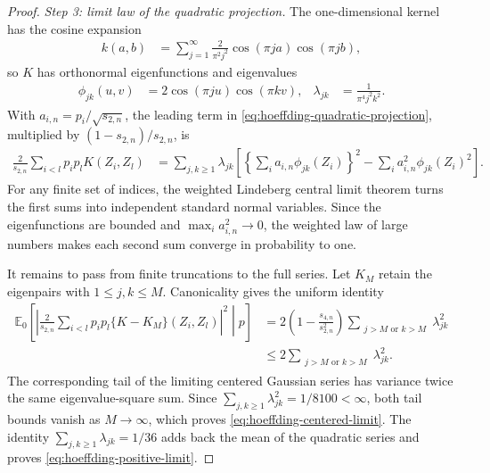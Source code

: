 \begin{proof}
\medskip\noindent
\emph{Step 3: limit law of the quadratic projection.}
The one-dimensional kernel has the cosine expansion
\begin{align*}
  k(a,b)
  &= \sum_{j=1}^{\infty}
     \frac{2}{\pi^2j^2}\cos(\pi ja)\cos(\pi jb),
\end{align*}
so $K$ has orthonormal eigenfunctions and eigenvalues
\begin{align*}
  \phi_{jk}(u,v)
  &=2\cos(\pi ju)\cos(\pi kv),
  &
  \lambda_{jk}
  &=\frac{1}{\pi^4j^2k^2}.
\end{align*}
With $a_{i,n}=p_i/\sqrt{s_{2,n}}$, the leading term in
\eqref{eq:hoeffding-quadratic-projection}, multiplied by
$(1-s_{2,n})/s_{2,n}$, is
\begin{align*}
  \frac{2}{s_{2,n}}\sum_{i<l}p_ip_lK(Z_i,Z_l)
  &=
  \sum_{j,k\geq1}\lambda_{jk}
  \left[
    \left\{\sum_i a_{i,n}\phi_{jk}(Z_i)\right\}^2
    -\sum_i a_{i,n}^2\phi_{jk}(Z_i)^2
  \right].
\end{align*}
For any finite set of indices, the weighted Lindeberg central limit theorem
turns the first sums into independent standard normal variables. Since the
eigenfunctions are bounded and $\max_i a_{i,n}^2\to0$, the weighted law of
large numbers makes each second sum converge in probability to one.

It remains to pass from finite truncations to the full series. Let $K_M$
retain the eigenpairs with $1\leq j,k\leq M$. Canonicality gives the
uniform identity
\begin{align*}
  \mathbb{E}_0\!\left[
    \left|
      \frac{2}{s_{2,n}}\sum_{i<l}p_ip_l
      \{K-K_M\}(Z_i,Z_l)
    \right|^2
    \middle|p
  \right]
  &=
  2\left(1-\frac{s_{4,n}}{s_{2,n}^2}\right)
  \sum_{\substack{j>M\text{ or }k>M}}
  \lambda_{jk}^2\\
  &\leq
  2\sum_{\substack{j>M\text{ or }k>M}}
  \lambda_{jk}^2.
\end{align*}
The corresponding tail of the limiting centered Gaussian series has variance
twice the same eigenvalue-square sum. Since
$\sum_{j,k\geq1}\lambda_{jk}^2=1/8100<\infty$, both tail bounds vanish as
$M\to\infty$, which proves \eqref{eq:hoeffding-centered-limit}. The identity
$\sum_{j,k\geq1}\lambda_{jk}=1/36$ adds back the mean of the quadratic
series and proves \eqref{eq:hoeffding-positive-limit}.


\end{proof}
